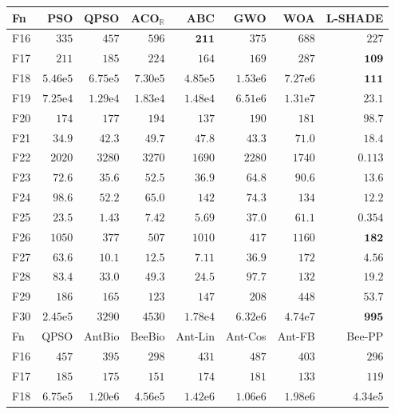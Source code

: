 \begin{tabular}{lrrrrrrr}
\toprule
Fn & PSO & QPSO & ACO$_\mathbb{R}$ & ABC & GWO & WOA & L-SHADE \\
\midrule
F16 & $335$ & $457$ & $596$ & $\mathbf{211}$ & $375$ & $688$ & $227$ \\
F17 & $211$ & $185$ & $224$ & $164$ & $169$ & $287$ & $\mathbf{109}$ \\
F18 & $5.46\mathrm{e}{5}$ & $6.75\mathrm{e}{5}$ & $7.30\mathrm{e}{5}$ & $4.85\mathrm{e}{5}$ & $1.53\mathrm{e}{6}$ & $7.27\mathrm{e}{6}$ & $\mathbf{111}$ \\
F19 & $7.25\mathrm{e}{4}$ & $1.29\mathrm{e}{4}$ & $1.83\mathrm{e}{4}$ & $1.48\mathrm{e}{4}$ & $6.51\mathrm{e}{6}$ & $1.31\mathrm{e}{7}$ & $\mathbf{23.1}$ \\
F20 & $174$ & $177$ & $194$ & $137$ & $190$ & $181$ & $\mathbf{98.7}$ \\
F21 & $34.9$ & $42.3$ & $49.7$ & $47.8$ & $43.3$ & $71.0$ & $18.4$ \\
F22 & $2020$ & $3280$ & $3270$ & $1690$ & $2280$ & $1740$ & $\mathbf{0.113}$ \\
F23 & $72.6$ & $35.6$ & $52.5$ & $36.9$ & $64.8$ & $90.6$ & $\mathbf{13.6}$ \\
F24 & $98.6$ & $52.2$ & $65.0$ & $142$ & $74.3$ & $134$ & $\mathbf{12.2}$ \\
F25 & $23.5$ & $1.43$ & $7.42$ & $5.69$ & $37.0$ & $61.1$ & $\mathbf{0.354}$ \\
F26 & $1050$ & $377$ & $507$ & $1010$ & $417$ & $1160$ & $\mathbf{182}$ \\
F27 & $63.6$ & $10.1$ & $12.5$ & $7.11$ & $36.9$ & $172$ & $\mathbf{4.56}$ \\
F28 & $83.4$ & $33.0$ & $49.3$ & $24.5$ & $97.7$ & $132$ & $\mathbf{19.2}$ \\
F29 & $186$ & $165$ & $123$ & $147$ & $208$ & $448$ & $\mathbf{53.7}$ \\
F30 & $2.45\mathrm{e}{5}$ & $3290$ & $4530$ & $1.78\mathrm{e}{4}$ & $6.32\mathrm{e}{6}$ & $4.74\mathrm{e}{7}$ & $\mathbf{995}$ \\
\midrule
Fn & QPSO & AntBio & BeeBio & Ant-Lin & Ant-Cos & Ant-FB & Bee-PP \\
\midrule
F16 & $457$ & $395$ & $298$ & $431$ & $487$ & $403$ & $296$ \\
F17 & $185$ & $175$ & $151$ & $174$ & $181$ & $133$ & $119$ \\
F18 & $6.75\mathrm{e}{5}$ & $1.20\mathrm{e}{6}$ & $4.56\mathrm{e}{5}$ & $1.42\mathrm{e}{6}$ & $1.06\mathrm{e}{6}$ & $1.98\mathrm{e}{6}$ & $4.34\mathrm{e}{5}$ \\

\end{tabular}
